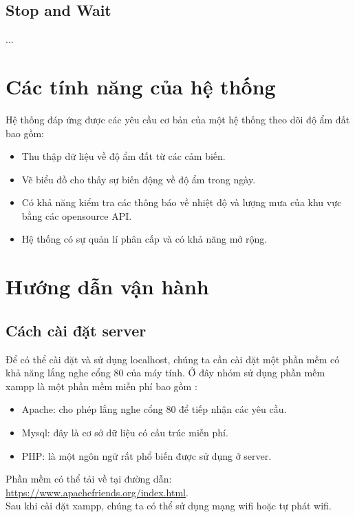\documentclass[a4paper]{article}
\begin{document}
	
	\subsection{Stop and Wait}
	...
\section{Các tính năng của hệ thống}
Hệ thống đáp ứng được các yêu cầu cơ bản của một hệ thống theo dõi độ ẩm đất bao gồm:
\begin{itemize}
    \item Thu thập dữ liệu về độ ẩm đất từ các cảm biến.
    \item Vẽ biểu đồ cho thấy sự biến động về độ ẩm trong ngày.
    \item Có khả năng kiểm tra các thông báo về nhiệt độ và lượng mưa của khu vực bằng các opensource API\cite{weatherAPI}.
    \item Hệ thống có sự quản lí phân cấp và có khả năng mở rộng.
\end{itemize}
\section{Hướng dẫn vận hành}
	\subsection{Cách cài đặt server}
	
    Để có thể cài đặt và sử dụng localhost, chúng ta cần cài đặt một phần mềm có khả năng lắng nghe cổng 80 của máy tính. Ở đây nhóm sử dụng phần mềm xampp là một phần mềm miễn phí bao gồm :
    \begin{itemize}
        \item Apache: cho phép lắng nghe cổng 80 để tiếp nhận các yêu cầu.
        \item Mysql: đây là cơ sở dữ liệu có cấu trúc miễn phí.
        \item PHP: là một ngôn ngữ rất phổ biến được sử dụng ở server.
    \end{itemize}
    
    Phần mềm có thể tải về tại đường dẫn: \url{https://www.apachefriends.org/index.html}.\\
    
    Sau khi cài đặt xampp, chúng ta có thể sử dụng mạng wifi hoặc tự phát wifi. \\
    
\end{document}
